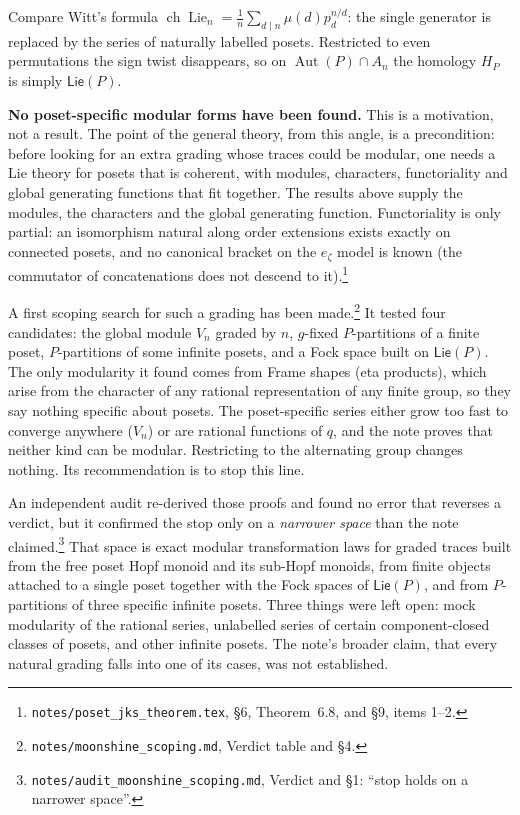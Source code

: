 \documentclass[11pt]{article}
\theoremstyle{definition}
\theoremstyle{remark}
\newcommand{\Aut}{\operatorname{Aut}}
\newcommand{\Lie}{\operatorname{Lie}}
\newcommand{\PLie}{\mathsf{Lie}}
\newcommand{\src}[1]{\nolinkurl{#1}}
\newcommand{\tagbox}[1]{\leavevmode\marginpar{\raggedright\fbox{\parbox{0.66in}{\centering\scriptsize\sffamily #1}}}}
\newcommand{\PROVEN}{\tagbox{PROVEN\\AUDITED}}
\begin{document}
Compare Witt's formula $\operatorname{ch}\Lie_n=\frac1n\sum_{d\mid
n}\mu(d)p_d^{n/d}$: the single generator is replaced by the series of
naturally labelled posets. Restricted to even permutations the sign twist
disappears, so on $\Aut(P)\cap A_n$ the homology $H_P$ is simply $\PLie(P)$.

\textbf{No poset-specific modular forms have been found.} This is a
motivation, not a result. The point of the general theory, from this angle, is a precondition:
before looking for an extra grading whose traces could be modular, one needs
a Lie theory for posets that is coherent, with modules, characters,
functoriality and global generating functions that fit together. The
results above supply the modules, the characters and the global generating
function. Functoriality is only partial: an isomorphism natural along order
extensions exists exactly on connected posets, and no canonical bracket on
the $e_\zeta$ model is known (the commutator of concatenations does not
descend to it).\footnote{\src{notes/poset_jks_theorem.tex}, \S6,
Theorem~6.8, and \S9, items 1--2.}

A first scoping search for such a grading has been
made.\footnote{\src{notes/moonshine_scoping.md}, Verdict table and \S4.} It
tested four candidates: the global module $V_n$ graded by
$n$, $g$-fixed $P$-partitions of a finite poset, $P$-partitions of some
infinite posets, and a Fock space built on $\PLie(P)$. The only modularity
it found comes from Frame shapes (eta products), which arise from the
character of any rational representation of any finite group, so they say
nothing specific about posets. The poset-specific series either grow too
fast to converge anywhere ($V_n$) or are rational functions of $q$, and the
note proves that neither kind can be modular. Restricting to the alternating
group changes nothing. Its recommendation is to stop this line.

An independent audit re-derived those proofs and found no error that
reverses a verdict, but it confirmed the stop only on a \emph{narrower
space} than the note claimed.\footnote{\src{notes/audit_moonshine_scoping.md},
Verdict and \S1: ``stop holds on a narrower space''.}\PROVEN{} That space is
exact modular transformation laws for graded traces built from the free poset
Hopf monoid and its sub-Hopf monoids, from finite objects attached to a single
poset together with the Fock spaces of $\PLie(P)$, and from $P$-partitions of
three specific infinite posets. Three things were left open: mock modularity
of the rational series, unlabelled series of certain component-closed classes
of posets, and other infinite posets. The note's broader claim, that every
natural grading falls into one of its cases, was not established.
\end{document}
